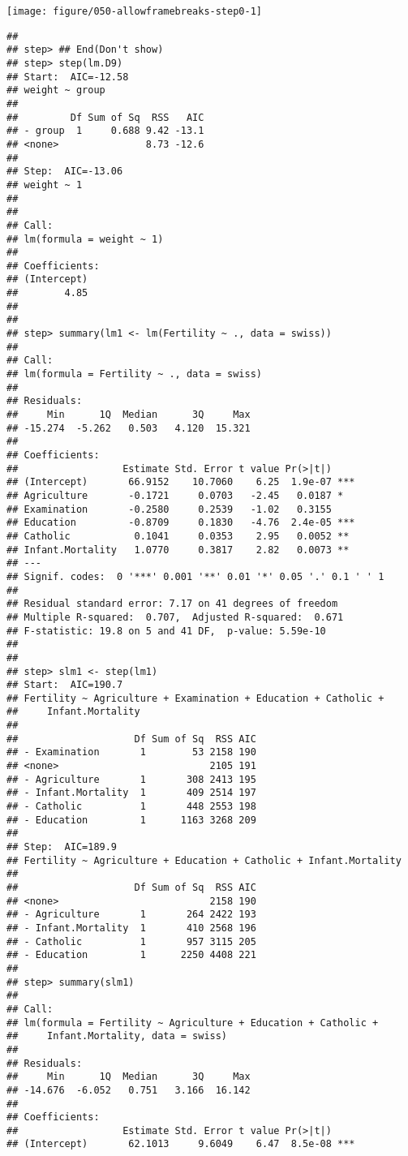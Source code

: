 \documentclass{beamer}\usepackage[]{graphicx}\usepackage[]{xcolor}
\newenvironment{knitrout}{}{} %
\begin{document}
\begin{frame}
\begin{knitrout}
\texttt{[image: figure/050-allowframebreaks-step0-1]} 
\begin{verbatim}
## 
## step> ## End(Don't show)
## step> step(lm.D9)
## Start:  AIC=-12.58
## weight ~ group
## 
##         Df Sum of Sq  RSS   AIC
## - group  1     0.688 9.42 -13.1
## <none>               8.73 -12.6
## 
## Step:  AIC=-13.06
## weight ~ 1
## 
## 
## Call:
## lm(formula = weight ~ 1)
## 
## Coefficients:
## (Intercept)  
##        4.85  
## 
## 
## step> summary(lm1 <- lm(Fertility ~ ., data = swiss))
## 
## Call:
## lm(formula = Fertility ~ ., data = swiss)
## 
## Residuals:
##     Min      1Q  Median      3Q     Max 
## -15.274  -5.262   0.503   4.120  15.321 
## 
## Coefficients:
##                  Estimate Std. Error t value Pr(>|t|)    
## (Intercept)       66.9152    10.7060    6.25  1.9e-07 ***
## Agriculture       -0.1721     0.0703   -2.45   0.0187 *  
## Examination       -0.2580     0.2539   -1.02   0.3155    
## Education         -0.8709     0.1830   -4.76  2.4e-05 ***
## Catholic           0.1041     0.0353    2.95   0.0052 ** 
## Infant.Mortality   1.0770     0.3817    2.82   0.0073 ** 
## ---
## Signif. codes:  0 '***' 0.001 '**' 0.01 '*' 0.05 '.' 0.1 ' ' 1
## 
## Residual standard error: 7.17 on 41 degrees of freedom
## Multiple R-squared:  0.707,	Adjusted R-squared:  0.671 
## F-statistic: 19.8 on 5 and 41 DF,  p-value: 5.59e-10
## 
## 
## step> slm1 <- step(lm1)
## Start:  AIC=190.7
## Fertility ~ Agriculture + Examination + Education + Catholic + 
##     Infant.Mortality
## 
##                    Df Sum of Sq  RSS AIC
## - Examination       1        53 2158 190
## <none>                          2105 191
## - Agriculture       1       308 2413 195
## - Infant.Mortality  1       409 2514 197
## - Catholic          1       448 2553 198
## - Education         1      1163 3268 209
## 
## Step:  AIC=189.9
## Fertility ~ Agriculture + Education + Catholic + Infant.Mortality
## 
##                    Df Sum of Sq  RSS AIC
## <none>                          2158 190
## - Agriculture       1       264 2422 193
## - Infant.Mortality  1       410 2568 196
## - Catholic          1       957 3115 205
## - Education         1      2250 4408 221
## 
## step> summary(slm1)
## 
## Call:
## lm(formula = Fertility ~ Agriculture + Education + Catholic + 
##     Infant.Mortality, data = swiss)
## 
## Residuals:
##     Min      1Q  Median      3Q     Max 
## -14.676  -6.052   0.751   3.166  16.142 
## 
## Coefficients:
##                  Estimate Std. Error t value Pr(>|t|)    
## (Intercept)       62.1013     9.6049    6.47  8.5e-08 ***

\end{verbatim}
\end{knitrout}
\end{frame}
\end{document}
